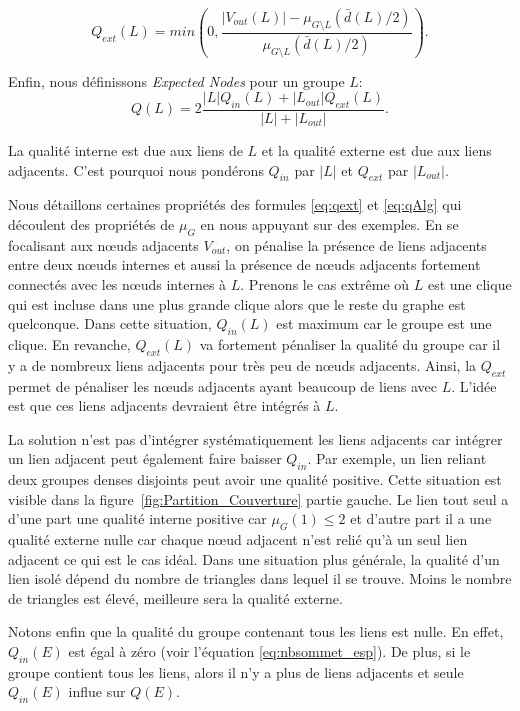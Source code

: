 \begin{equation}
\label{eq:qext} Q_{ext}(L) = min \left(0, \dfrac{|V_{out}(L)| - \mu_{G\setminus L}(\bar{d}(L)/2)}{\mu_{G\setminus L}(\bar{d}(L)/2)} \right).
\end{equation}


Enfin, nous définissons \emph{Expected Nodes} pour un groupe $L$:
\begin{equation}
	\label{eq:qAlg}
	Q(L)  =  2\dfrac{ |L|Q_{in}(L) + |L_{out}|Q_{ext}(L)}{|L|+|L_{out}|}.
\end{equation}

La qualité interne est due aux liens de $L$ et la qualité externe est due aux liens adjacents.
C'est pourquoi nous pondérons $Q_{in}$ par $|L|$ et $Q_{ext}$ par $|L_{out}|$.



Nous détaillons certaines propriétés des formules \ref{eq:qext} et \ref{eq:qAlg} qui découlent des propriétés de $\mu_{G}$ en nous appuyant sur des exemples.
En se focalisant aux n\oe{}uds adjacents $V_{out}$, on pénalise la présence de liens adjacents entre deux n\oe{}uds internes et aussi la présence de n\oe{}uds adjacents fortement connectés avec les n\oe{}uds internes à $L$.
Prenons le cas extrême où $L$ est une clique qui est incluse dans une plus grande clique alors que le reste du graphe est quelconque.
Dans cette situation, $Q_{in}(L)$ est maximum car le groupe est une clique.
En revanche, $Q_{ext}(L)$ va fortement pénaliser la qualité du groupe car il y a de nombreux liens adjacents pour très peu de n\oe{}uds adjacents.
Ainsi, la $Q_{ext}$ permet de pénaliser les n\oe{}uds adjacents ayant beaucoup de liens avec $L$.
L'idée est que ces liens adjacents devraient être intégrés à $L$.

La solution n'est pas d'intégrer systématiquement  les liens adjacents car intégrer un lien adjacent peut également faire baisser $Q_{in}$.
Par exemple, un lien reliant deux groupes denses disjoints peut avoir une qualité positive.
Cette situation est visible dans la figure~\ref{fig:Partition_Couverture} partie gauche.
Le lien tout seul a d'une part une qualité interne positive car $\mu_G(1) \leq 2$ et d'autre part il a une qualité externe nulle car chaque n\oe{}ud adjacent n'est relié qu'à un seul lien adjacent ce qui est le cas idéal.
Dans une situation plus générale, la qualité d'un lien isolé dépend du nombre de triangles dans lequel il se trouve.
Moins le nombre de triangles est élevé, meilleure sera la qualité externe.

Notons enfin que la qualité du groupe contenant tous les liens est nulle.
En effet, $Q_{in}(E)$ est égal à zéro (voir l'équation \ref{eq:nbsommet_esp}).
De plus, si le groupe contient tous les liens, alors il n'y a plus de liens adjacents et seule $Q_{in}(E)$ influe sur $Q(E)$.



